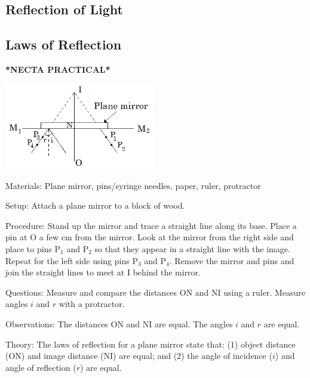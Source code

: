 \begin{multicols}{2}
\vfill
\columnbreak


\section*{Reflection of Light}


\subsection{Laws of Reflection}
\textbf{*NECTA PRACTICAL*}

\begin{center}
\includegraphics[width=0.49\textwidth]{./img/plane-mirror-prac.png}
\end{center}

\begin{description*}
\item[Materials:]{Plane mirror, pins/syringe needles, paper, ruler, protractor}
\item[Setup:]{Attach a plane mirror to a block of wood.}
\item[Procedure:]{Stand up the mirror and trace a straight line along its base. Place a pin at O a few cm from the mirror. Look at the mirror from the right side and place to pins P$_1$ and P$_2$ so that they appear in a straight line with the image. Repeat for the left side using pins P$_3$ and P$_4$. Remove the mirror and pins and join the straight lines to meet at I behind the mirror.}
\item[Questions:]{Measure and compare the distances ON and NI using a ruler. Measure angles $i$ and $r$ with a protractor.}
\item[Observations:]{The distances ON and NI are equal. The angles $i$ and $r$ are equal.}
\item[Theory:]{The laws of reflection for a plane mirror state that: (1) object distance (ON) and image distance (NI) are equal; and (2) the angle of incidence ($i$) and angle of reflection ($r$) are equal.}
\end{description*}


\end{multicols}
